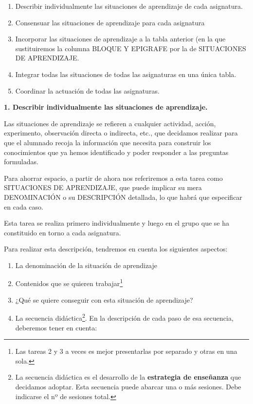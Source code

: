 \documentclass[
]{article}
\providecommand{\tightlist}{%
  \setlength{\itemsep}{0pt}\setlength{\parskip}{0pt}}
\begin{document}
\begin{enumerate}
\def\labelenumi{\arabic{enumi}.}
\tightlist
\item
  Describir individualmente las situaciones de aprendizaje de cada
  asignatura.
\item
  Consensuar las situaciones de aprendizaje para cada asignatura
\item
  Incorporar las situaciones de aprendizaje a la tabla anterior (en la
  que sustituiremos la columna BLOQUE Y EPIGRAFE por la de SITUACIONES
  DE APRENDIZAJE.
\item
  Integrar todas las situaciones de todas las asignaturas en una única
  tabla.
\item
  Coordinar la actuación de todas las asignaturas.
\end{enumerate}

\textbf{1. Describir individualmente las situaciones de aprendizaje.}

Las situaciones de aprendizaje se refieren a cualquier actividad,
acción, experimento, observación directa o indirecta, etc., que
decidamos realizar para que el alumnado recoja la información que
necesita para construir los conocimientos que ya hemos identificado y
poder responder a las preguntas formuladas.

Para ahorrar espacio, a partir de ahora nos referiremos a esta tarea
como SITUACIONES DE APRENDIZAJE, que puede implicar su mera DENOMINACIÓN
o su DESCRIPCIÓN detallada, lo que habrá que especificar en cada caso.

Esta tarea se realiza primero individualmente y luego en el grupo que se
ha constituido en torno a cada asignatura.

Para realizar esta descripción, tendremos en cuenta los siguientes
aspectos:

\begin{enumerate}
\def\labelenumi{\arabic{enumi}.}
\tightlist
\item
  La denominación de la situación de aprendizaje
\item
  Contenidos que se quieren trabajar\footnote{Las tareas 2 y 3 a veces
    es mejor presentarlas por separado y otras en una sola.}
\item
  ¿Qué se quiere conseguir con esta situación de aprendizaje?
\item
  La secuencia didáctica\footnote{La secuencia didáctica es el
    desarrollo de la \textbf{estrategia de enseñanza} que decidamos
    adoptar. Esta secuencia puede abarcar una o más sesiones. Debe
    indicarse el nº de sesiones total.}. En la descripción de cada paso
  de esa secuencia, deberemos tener en cuenta:
\end{enumerate}
\end{document}
